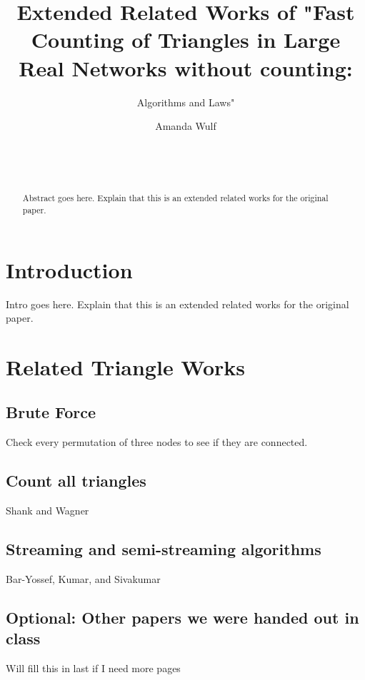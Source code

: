 \documentclass{acm_proc_article-sp}
\begin{document}
\title{Extended Related Works of "Fast Counting of Triangles in Large Real Networks without counting:}
\subtitle{Algorithms and Laws"}

\author{
\alignauthor
Amanda Wulf\\
       \\
       \\
       \\
}

\maketitle
\begin{abstract}
Abstract goes here. Explain that this is an extended related works for the original paper.
\end{abstract}

\section{Introduction}
Intro goes here. Explain that this is an extended related works for the original paper.

\section{Related Triangle Works}

\subsection{Brute Force}
Check every permutation of three nodes to see if they are connected.

\subsection{Count all triangles}
Shank and Wagner

\subsection{Streaming and semi-streaming algorithms}
Bar-Yossef, Kumar, and Sivakumar

\subsection{Optional: Other papers we were handed out in class}
Will fill this in last if I need more pages
\end{document}

